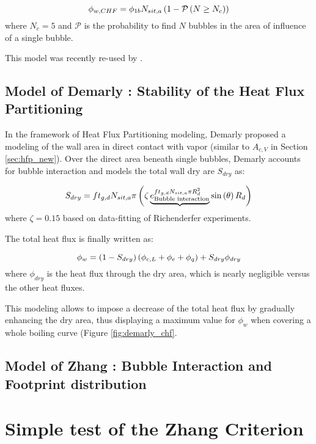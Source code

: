 \begin{equation}
\phi_{w,CHF} = \phi_{1b}N_{sit,a} \left( 1 - \mathcal{P}\left( N \geq N_{c} \right) \right)
\end{equation}
where $N_{c}=5$ and $\mathcal{P}$ is the probability to find $N$ bubbles in the area of influence of a single bubble.


This model was recently re-used by \cite{papier_ICONE_Stephane}.


\subsection{Model of Demarly \etal : Stability of the Heat Flux Partitioning}

In the framework of Heat Flux Partitioning modeling, Demarly proposed a modeling of the wall area in direct contact with vapor (similar to $A_{c,V}$ in Section \ref{sec:hfp_new}). Over the direct area beneath single bubbles, Demarly accounts for bubble interaction and models the total wall dry are $S_{dry}$ as:

\begin{equation}
S_{dry} = ft_{g,d} N_{sit,a} \pi \left( \zeta \underbrace{ e^{f t_{g,d}N_{sit,a} \pi R_{d}^{2} }_{\text{Bubble interaction}} } \mathrm{sin}\left( \theta \right) R_{d}  \right)
\end{equation} 
where $\zeta=0.15$ based on data-fitting of Richenderfer \cite{richenderfer_experimental_2018} experiments.

The total heat flux is finally written as:

\begin{equation}
\phi_{w}=\left( 1-S_{dry} \right)\left( \phi_{c,L} + \phi_{e} + \phi_{q} \right) + S_{dry} \phi_{dry}
\end{equation}
where $\phi_{dry}$ is the heat flux through the dry area, which is nearly negligible versus the other heat fluxes.

\npar

This modeling allows to impose a decrease of the total heat flux by gradually enhancing the dry area, thus displaying a maximum value for $\phi_{w}$ when covering a whole boiling curve (Figure \ref{fig:demarly_chf}.


\subsection{Model of Zhang \etal : Bubble Interaction and Footprint distribution}




\section{Simple test of the Zhang Criterion}



